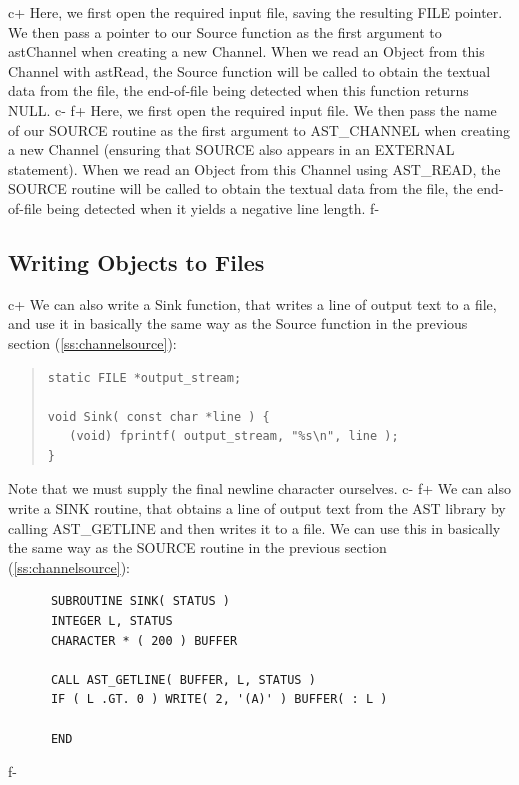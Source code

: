 \documentclass[twoside,11pt]{article}
\newcommand{\secref}[1]{\S\ref{#1}}
\renewcommand{\secref}[1]{\ref{#1}}
\begin{document}
c+
Here, we first open the required input file, saving the resulting FILE
pointer. We then pass a pointer to our Source function as the first
argument to astChannel when creating a new Channel. When we read
an Object from this Channel with astRead, the Source
function will be called to obtain the textual data from the file, the
end-of-file being detected when this function returns NULL.
c-
f+
Here, we first open the required input file.  We then pass the name of
our SOURCE routine as the first argument to AST\_CHANNEL when creating
a new Channel (ensuring that SOURCE also appears in an EXTERNAL
statement). When we read an Object from this Channel using
AST\_READ, the SOURCE routine will be called to obtain the textual
data from the file, the end-of-file being detected when it yields a
negative line length.
f-

\subsection{\label{ss:channelsink}Writing Objects to Files}

c+
We can also write a Sink function, that writes a line of output text
to a file, and use it in basically the same way as the Source function
in the previous section (\secref{ss:channelsource}):

\begin{quote}
\small
\begin{verbatim}
static FILE *output_stream;

void Sink( const char *line ) {
   (void) fprintf( output_stream, "%s\n", line );
}
\end{verbatim}
\normalsize
\end{quote}

Note that we must supply the final newline character ourselves.
c-
f+
We can also write a SINK routine, that obtains a line of output text
from the AST library by calling AST\_GETLINE and then writes it to a
file. We can use this in basically the same way as the SOURCE routine
in the previous section (\secref{ss:channelsource}):

\small
\begin{verbatim}
      SUBROUTINE SINK( STATUS )
      INTEGER L, STATUS
      CHARACTER * ( 200 ) BUFFER

      CALL AST_GETLINE( BUFFER, L, STATUS )
      IF ( L .GT. 0 ) WRITE( 2, '(A)' ) BUFFER( : L )

      END
\end{verbatim}
\normalsize
f-
\end{document}
